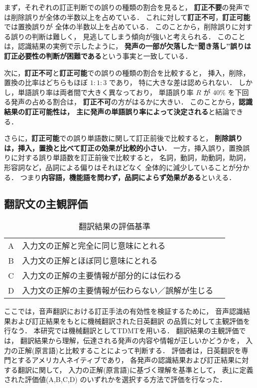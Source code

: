まず，それぞれの訂正判断での誤りの種類の割合を見ると，
{\bf 訂正不要}の発声では削除誤りが全体の半数以上を占めている．
これに対して{\bf 訂正不可}，{\bf 訂正可能}では置換誤りが
全体の半数以上を占めている．
このことから，削除誤りに対する誤りの判断は難しく，
見逃してしまう傾向が強いと考えられる．
このことは，認識結果の実例で示したように，
{\bf 発声の一部が欠落した``聞き落し''誤りは
訂正必要性の判断が困難である}という事実と一致している．

次に，{\bf 訂正不可}と{\bf 訂正可能}での誤りの種類の割合を比較すると，
挿入，削除，置換の比率はどちらもほぼ $1 : 1 : 3$ であり，
特に大きな差は認められない．
しかし，単語誤り率は両者間で大きく異なっており，
単語誤り率 $R$ が $40\%$ を下回る発声の占める割合は，
{\bf 訂正不可}の方がはるかに大きい．
このことから，{\bf 認識結果の訂正可能性は，
主に発声の単語誤り率によって決定される}と結論できる．

さらに，{\bf 訂正可能}での誤り単語数に関して訂正前後で比較すると，
{\bf 削除誤りは，挿入，置換と比べて訂正の効果が比較的小さい}．
一方，挿入誤り，置換誤りに対する誤り単語数を訂正前後で比較すると，
名詞，動詞，助動詞，助詞，形容詞など，品詞による偏りはそれほどなく
全体的に減少していることが分かる．
つまり{\bf 内容語，機能語を問わず，品詞によらず効果がある}といえる．


\subsection{翻訳文の主観評価}

\begin{table}
\begin{center}
\caption{翻訳結果の評価基準}
\label{trans-eval-rank}
\begin{tabular}{clc}
A & 入力文の正解と完全に同じ意味にとれる \\
B & 入力文の正解とほぼ同じ意味にとれる \\
C & 入力文の正解の主要情報が部分的には伝わる \\
D & 入力文の正解の主要情報が伝わらない／誤解が生じる \\
\end{tabular}
\end{center}
\end{table}

ここでは，音声翻訳における訂正手法の有効性を検証するために，
音声認識結果および訂正結果をもとに機械翻訳された日英翻訳
の品質に対して主観評価を行なう．
本研究では機械翻訳としてTDMT\cite{Sumita1999}を用いる．
翻訳結果の主観評価では，
翻訳結果から理解，伝達される発声の内容や情報が正しいかどうかを，
入力の正解(原言語)と比較することによって判断する．
評価者は，日英翻訳を専門とするアメリカ人ネイティブであり，
各発声の認識結果および訂正結果に対する翻訳に関して，
入力の正解(原言語)に基づく理解を基準として，
表\ref{trans-eval-rank}に定義された評価値(A,B,C,D)
のいずれかを選択する方法で評価を行なった．

